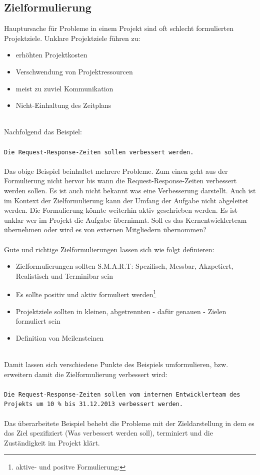 \documentclass[11pt]{scrartcl}
\begin{document}
\subsection{Zielformulierung}
Hauptursache für Probleme in einem Projekt sind oft schlecht formulierten Projektziele. Unklare Projektziele führen zu:
\begin{itemize}
    \item{erhöhten Projektkosten}
    \item{Verschwendung von Projektressourcen}
    \item{meist zu zuviel Kommunikation}
    \item{Nicht-Einhaltung des Zeitplans}
\end{itemize}
\ \\
Nachfolgend das Beispiel: \\ 
\\
\texttt{Die Request-Response-Zeiten sollen verbessert werden.}\\
\\
Das obige Beispiel beinhaltet mehrere Probleme. Zum einen geht aus der Formulierung nicht hervor bis wann die Request-Response-Zeiten verbessert werden sollen. Es ist auch nicht bekannt was eine Verbesserung darstellt. Auch ist im Kontext der Zielformulierung kann der Umfang der Aufgabe nicht abgeleitet werden. Die Formulierung könnte weiterhin aktiv geschrieben werden. Es ist unklar wer im Projekt die Aufgabe übernimmt. Soll es das Kernentwicklerteam übernehmen oder wird es von externen Mitgliedern übernommen?\\
\\
Gute und richtige Zielformulierungen lassen sich wie folgt definieren: 
\begin{itemize}
    \item{Zielformulierungen sollten S.M.A.R.T: Spezifisch, Messbar, Akzpetiert, Realistisch und Terminibar sein}
    \item{Es sollte positiv und aktiv formuliert werden\footnote{aktive- und positve Formulierung: }} %
    \item{Projektziele sollten in kleinen, abgetrennten - dafür genauen - Zielen formuliert sein}
    \item{Definition von Meilensteinen}
\end{itemize}
\ \\
Damit lassen sich verschiedene Punkte des Beispiels umformulieren, bzw. erweitern damit die Zielformulierung verbessert wird:\\
\\
\texttt{Die Request-Response-Zeiten sollen vom internen Entwicklerteam des\\
Projekts um 10 \% bis 31.12.2013 verbessert werden.} \\
\\
Das überarbeitete Beispiel behebt die Probleme mit der Zieldarstellung in dem es das Ziel spezifiziert (Was verbessert werden soll), terminiert und die Zuständigkeit im Projekt klärt.
\end{document}
